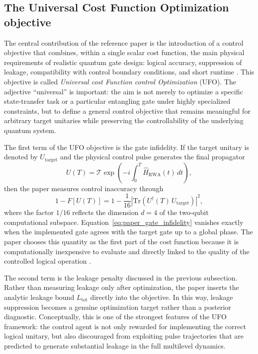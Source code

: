 \subsection{The Universal Cost Function Optimization objective}
\label{subsec:ufo_cost_function}

The central contribution of the reference paper is the introduction of a control objective that combines, within a single scalar cost function, the main physical requirements of realistic quantum gate design: logical accuracy, suppression of leakage, compatibility with control boundary conditions, and short runtime \cite{Niu2019}. This objective is called \emph{Universal cost Function control Optimization} (UFO). The adjective ``universal'' is important: the aim is not merely to optimize a specific state-transfer task or a particular entangling gate under highly specialized constraints, but to define a general control objective that remains meaningful for arbitrary target unitaries while preserving the controllability of the underlying quantum system.

The first term of the UFO objective is the gate infidelity. If the target unitary is denoted by $U_{\mathrm{target}}$ and the physical control pulse generates the final propagator
\begin{equation}
U(T)
=
\mathcal{T}
\exp\!\left(
-i\int_{0}^{T}\hat{H}_{\mathrm{RWA}}(t)\,dt
\right),
\label{eq:paper_final_propagator}
\end{equation}
then the paper measures control inaccuracy through
\begin{equation}
1-F[U(T)]
=
1-
\frac{1}{16}
\left|
\mathrm{Tr}\!\left(
U^{\dagger}(T)\,U_{\mathrm{target}}
\right)
\right|^{2},
\label{eq:paper_gate_infidelity}
\end{equation}
where the factor \(1/16\) reflects the dimension \(d=4\) of the two-qubit computational subspace. Equation~\eqref{eq:paper_gate_infidelity} vanishes exactly when the implemented gate agrees with the target gate up to a global phase. The paper chooses this quantity as the first part of the cost function because it is computationally inexpensive to evaluate and directly linked to the quality of the controlled logical operation \cite{Niu2019}.

The second term is the leakage penalty discussed in the previous subsection. Rather than measuring leakage only after optimization, the paper inserts the analytic leakage bound \(L_{\mathrm{tot}}\) directly into the objective. In this way, leakage suppression becomes a genuine optimization target rather than a posterior diagnostic. Conceptually, this is one of the strongest features of the UFO framework: the control agent is not only rewarded for implementing the correct logical unitary, but also discouraged from exploiting pulse trajectories that are predicted to generate substantial leakage in the full multilevel dynamics.

